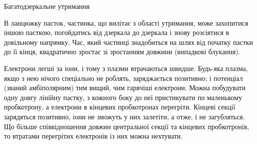 \documentclass[]{beamer}
\begin{document}
\begin{frame}{Багатодзеркальне утримання}{}
	\begin{center}
		
	\end{center}
	\begin{block}{}\justifying
		В ланцюжку пасток, частинка, що вилітає з області утримання, може захопитися іншою пасткою, погойдатись від дзеркала до дзеркала і знову розсіятися в довільному напрямку. Час, який частинці знадобиться на шлях від початку пастки до її кінця, квадратично зростає зі зростанням довжини (випадкові блукання).
	\end{block}

	\begin{block}{}\justifying\footnotesize
		Електрони легші за іони, і тому з плазми втрачаються швидше. Будь-яка плазма, якщо з нею нічого
		спеціально не роблять, заряджається позитивно; і потенціал (званий амбіполярним) тим вищий, чим
		гарячіші електрони. Можна побудувати одну довгу лінійну пастку, з кожного боку до неї пристикувати
		по маленькому пробкотрону, а електрони в кінцевих пробкотронах перегріти. Кінцеві секції
		зарядяться позитивно, іони не зможуть у них залетіти, а отже, і не загубляться. Що більше
		співвідношення довжин центральної секції та кінцевих пробкотронів, то втратами перегрітих
		електронів із них можна нехтувати.
	\end{block}
\end{frame}
\end{document}
